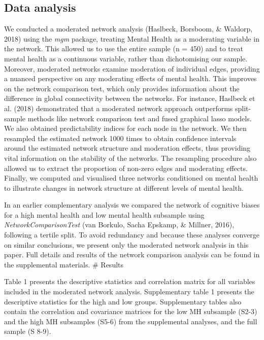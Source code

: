 \documentclass[
  english,
  man]{apa6}
\begin{document}
\hypertarget{data-analysis}{%
\subsection{Data analysis}\label{data-analysis}}

We conducted a moderated network analysis (Haslbeck, Borsboom, \& Waldorp, 2018) using the \emph{mgm} package, treating Mental Health as a moderating variable in the network. This allowed us to use the entire sample (n = 450) and to treat mental health as a continuous variable, rather than dichotomising our sample. Moreover, moderated networks examine moderation of individual edges, providing a nuanced perspective on any moderating effects of mental health. This improves on the network comparison test, which only provides information about the difference in global connectivity between the networks. For instance, Haslbeck et al. (2018) demonstrated that a moderated network approach outperforms split-sample methods like network comparison test and fused graphical lasso models. We also obtained predictability indices for each node in the network. We then resampled the estimated network 1000 times to obtain confidence intervals around the estimated network structure and moderation effects, thus providing vital information on the stability of the networks. The resampling procedure also allowed us to extract the proportion of non-zero edges and moderating effects. Finally, we computed and visualised three networks conditioned on mental health to illustrate changes in network structure at different levels of mental health.

In an earlier complementary analysis we compared the network of cognitive biases for a high mental health and low mental health subsample using \emph{NetworkComparisonTest} (van Borkulo, Sacha Epskamp, \& Millner, 2016), following a tertile split. To avoid redundancy and because these analyses converge on similar conclusions, we present only the moderated network analysis in this paper. Full details and results of the network comparison analysis can be found in the supplemental materials.
\# Results

Table 1 presents the descriptive statistics and correlation matrix for all variables included in the moderated network analysis. Supplementary table 1 presents the descriptive statistics for the high and low groups. Supplementary tables also contain the correlation and covariance matrices for the low MH subsample (S2-3) and the high MH subsamples (S5-6) from the supplemental analyses, and the full sample (S 8-9).
\end{document}
